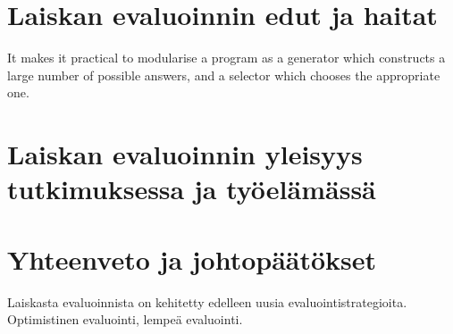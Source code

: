 \section{Laiskan evaluoinnin edut ja haitat}

It makes it practical to modularise a program as a generator which constructs a large number of possible answers, and a selector which chooses the appropriate one.



\section{Laiskan evaluoinnin yleisyys tutkimuksessa ja työelämässä}



\section{Yhteenveto ja johtopäätökset}

Laiskasta evaluoinnista on kehitetty edelleen uusia evaluointistrategioita. Optimistinen evaluointi, lempeä evaluointi. \citep{ennals2003optimistic} \citep{maessen2002hybrid}

